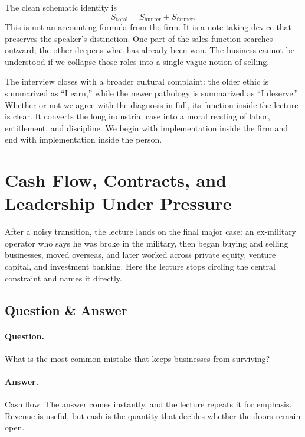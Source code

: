 The clean schematic identity is
\begin{equation}
S_{\text{total}} = S_{\text{hunter}} + S_{\text{farmer}}.
\end{equation}
This is not an accounting formula from the firm. It is a note-taking device that preserves the speaker's distinction. One part of the sales function searches outward; the other deepens what has already been won. The business cannot be understood if we collapse those roles into a single vague notion of selling.

The interview closes with a broader cultural complaint: the older ethic is summarized as ``I earn,'' while the newer pathology is summarized as ``I deserve.'' Whether or not we agree with the diagnosis in full, its function inside the lecture is clear. It converts the long industrial case into a moral reading of labor, entitlement, and discipline. We begin with implementation inside the firm and end with implementation inside the person.

\section{Cash Flow, Contracts, and Leadership Under Pressure}

After a noisy transition, the lecture lands on the final major case: an ex-military operator who says he was broke in the military, then began buying and selling businesses, moved overseas, and later worked across private equity, venture capital, and investment banking. Here the lecture stops circling the central constraint and names it directly.

\subsection{Question \& Answer}

\paragraph{Question.} What is the most common mistake that keeps businesses from surviving?

\paragraph{Answer.} Cash flow. The answer comes instantly, and the lecture repeats it for emphasis. Revenue is useful, but cash is the quantity that decides whether the doors remain open.

